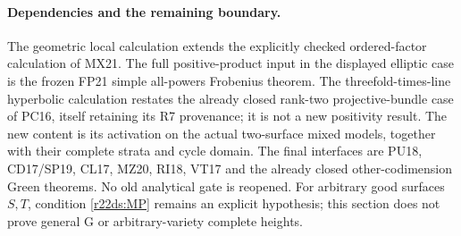 \paragraph{Dependencies and the remaining boundary.}
The geometric local calculation extends the explicitly checked
ordered-factor calculation of MX21.  The full positive-product
input in the displayed elliptic case is the frozen FP21 simple
all-powers Frobenius theorem.  The threefold-times-line hyperbolic
calculation restates the already closed rank-two projective-bundle
case of PC16, itself retaining its R7 provenance; it is not a new
positivity result.  The new content is its activation on the actual
two-surface mixed models, together with their complete strata and
cycle domain.  The final
interfaces are PU18, CD17/SP19, CL17, MZ20, RI18, VT17 and the
already closed other-codimension Green theorems.  No old analytical
gate is reopened.  For arbitrary good surfaces $S,T$, condition
\eqref{r22ds:MP} remains an explicit hypothesis; this section does
not prove general G or arbitrary-variety complete heights.
